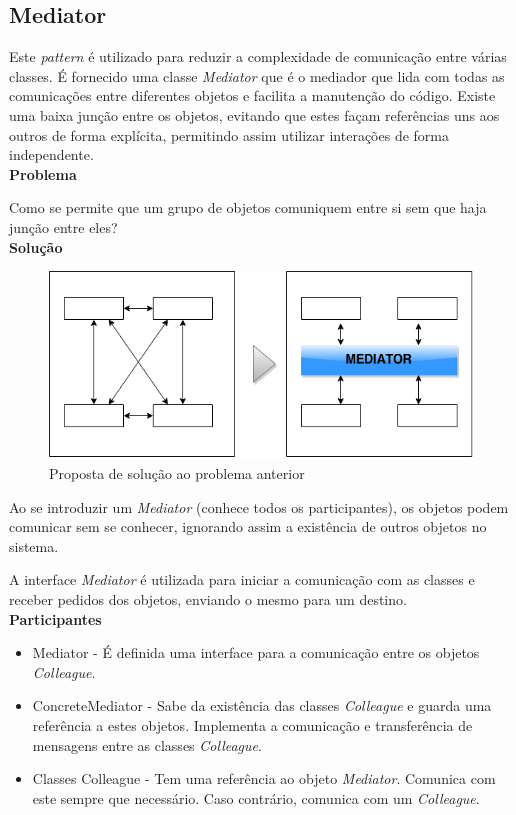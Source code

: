 \subsection{Mediator}

Este \textit{pattern} é utilizado para reduzir a complexidade de comunicação entre várias classes. É fornecido uma classe \textit{Mediator} que é o mediador que lida com todas as comunicações entre diferentes objetos e facilita a manutenção do código.
Existe uma baixa junção entre os objetos, evitando que estes façam referências uns aos outros de forma explícita, permitindo assim utilizar interações de forma independente.\\

\textbf{Problema}

Como se permite que um grupo de objetos comuniquem entre si sem que haja junção entre eles?\\

\textbf{Solução}

\begin{figure}[!h]
\centering
\includegraphics[scale=0.7]{img/mediator-solucao}
\caption{Proposta de solução ao problema anterior}
\end{figure}

Ao se introduzir um \textit{Mediator} (conhece todos os participantes), os objetos podem comunicar sem se conhecer, ignorando assim a existência de outros objetos no sistema.

A interface \textit{Mediator} é utilizada para iniciar a comunicação com as classes e receber pedidos dos objetos, enviando o mesmo para um destino.\\


\textbf{Participantes}

\begin{itemize}
  \item Mediator - É definida uma interface para a comunicação entre os objetos \textit{Colleague}.

  \item ConcreteMediator - Sabe da existência das classes \textit{Colleague} e guarda uma referência a estes objetos. Implementa a comunicação e transferência de mensagens entre as classes \textit{Colleague}.

  \item Classes Colleague - Tem uma referência ao objeto \textit{Mediator}. Comunica com este sempre que necessário. Caso contrário, comunica com um \textit{Colleague}.\\
\end{itemize}

